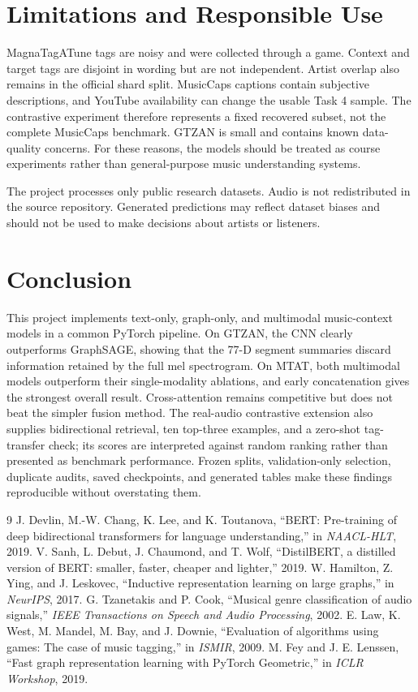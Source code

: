 \documentclass[conference]{IEEEtran}
\begin{document}
\section{Limitations and Responsible Use}
MagnaTagATune tags are noisy and were collected through a game. Context and target tags are
disjoint in wording but are not independent. Artist overlap also remains in the official shard
split. MusicCaps captions contain subjective descriptions, and YouTube availability can change
the usable Task 4 sample. The contrastive experiment therefore represents a fixed recovered
subset, not the complete MusicCaps benchmark. GTZAN is small and contains known data-quality
concerns. For these
reasons, the models should be treated as course experiments rather than general-purpose music
understanding systems.

The project processes only public research datasets. Audio is not redistributed in the source
repository. Generated predictions may reflect dataset biases and should not be used to make
decisions about artists or listeners.

\section{Conclusion}
This project implements text-only, graph-only, and multimodal music-context models in a common
PyTorch pipeline. On GTZAN, the CNN clearly outperforms GraphSAGE, showing that the 77-D segment
summaries discard information retained by the full mel spectrogram. On MTAT, both multimodal
models outperform their single-modality ablations, and early concatenation gives the strongest
overall result. Cross-attention remains competitive but does not beat the simpler fusion method.
The real-audio contrastive extension also supplies bidirectional retrieval, ten top-three
examples, and a zero-shot tag-transfer check; its scores are interpreted against random ranking
rather than presented as benchmark performance.
Frozen splits, validation-only selection, duplicate audits, saved checkpoints, and generated
tables make these findings reproducible without overstating them.

\begin{thebibliography}{9}
 J. Devlin, M.-W. Chang, K. Lee, and K. Toutanova, ``BERT: Pre-training of deep
bidirectional transformers for language understanding,'' in \emph{NAACL-HLT}, 2019.
 V. Sanh, L. Debut, J. Chaumond, and T. Wolf, ``DistilBERT, a distilled
version of BERT: smaller, faster, cheaper and lighter,'' 2019.
 W. Hamilton, Z. Ying, and J. Leskovec, ``Inductive representation learning
on large graphs,'' in \emph{NeurIPS}, 2017.
 G. Tzanetakis and P. Cook, ``Musical genre classification of audio signals,''
\emph{IEEE Transactions on Speech and Audio Processing}, 2002.
 E. Law, K. West, M. Mandel, M. Bay, and J. Downie, ``Evaluation of algorithms
using games: The case of music tagging,'' in \emph{ISMIR}, 2009.
 M. Fey and J. E. Lenssen, ``Fast graph representation learning with PyTorch
Geometric,'' in \emph{ICLR Workshop}, 2019.
\end{thebibliography}
\end{document}
